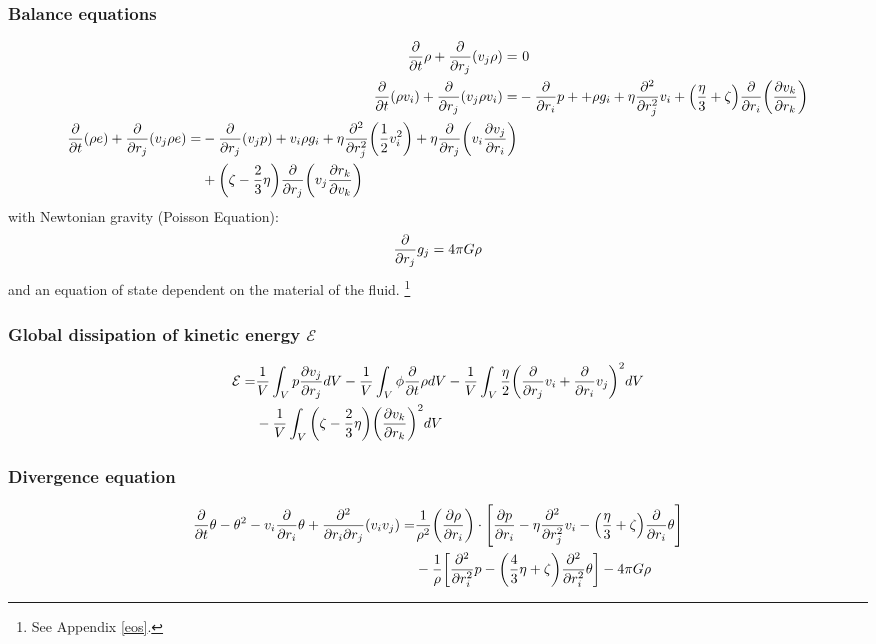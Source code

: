 \subsubsection*{Balance equations}
\begin{align}
\pd{t}\rho + \pd{r_j}(v_j \rho) =&\ 0 \label{eq:ncmass}\\
\pd{t}(\rho v_i) + \pd{r_j}(v_j \rho v_i) =& -\pd{r_i}p + +\rho g_i
+\eta\pdd{r_j}v_i
+\lra{\frac{\eta}{3}+\zeta}\pd{r_i}\lra{\ppd{r_k}{v_k}} \label{eq:ncmom}\\
\begin{split}
\pd{t}(\rho e) + \pd{r_j}(v_j \rho e) =& -\pd{r_j}(v_j p) + v_i \rho g_i 
+\eta \pdd{r_j}\lra{\frac{1}{2}v_i^2}+ \eta \pd{r_j}\lra{v_i\ppd{r_i}{v_j}} \\
&+\lra{\zeta-\frac{2}{3}\eta} \pd{r_j}\lra{v_j\ppd{v_k}{r_k}} \label{eq:ncetot}
\end{split}
\end{align}
with Newtonian gravity (Poisson Equation):
\begin{align}
\pd{r_j}g_j=4\pi G \rho
\end{align}
and an equation of state dependent on the material of the fluid.
\footnote{See Appendix \ref{eos}.}

\subsubsection*{Global dissipation of kinetic energy $\mathcal{E}$}
\begin{align}
\begin{split}
\mathcal{E} =& 
\frac{1}{V} \int_V p \ppd{r_j}{v_j} dV
-\frac{1}{V} \int_V \phi \pd{t}\rho dV
-\frac{1}{V} \int_V \frac{\eta}{2}\lra{\pd{r_j}v_i+\pd{r_i}v_j}^2 dV\\
&-\frac{1}{V} \int_V \lra{\zeta-\frac{2}{3}\eta}\lra{\ppd{r_k}{v_k}}^2 dV
\end{split}
\label{eq:ncdiss}
\end{align}

\subsubsection*{Divergence equation}
\begin{align}
\begin{split}
\pd{t}\theta-\theta^2-v_i\pd{r_i}\theta
+\frac{\partial^2}{\partial r_i \partial r_j}(v_i v_j) =&
\frac{1}{\rho^2}\lra{\ppd{r_i}{\rho}} \cdot
\lrb{\ppd{r_i}{p}-\eta\pdd{r_j}v_i-\lra{\frac{\eta}{3}+\zeta}
\pd{r_i}\theta}\\
&-\frac{1}{\rho}\lrb{\pdd{r_i}p-\lra{\frac{4}{3}\eta+\zeta}\pdd{r_i}\theta} 
-4\pi G \rho
\end{split}
\end{align}

